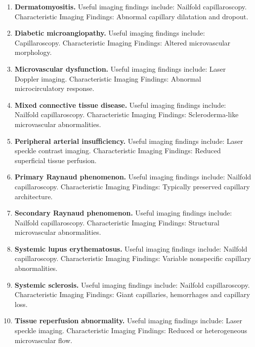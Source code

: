\begin{enumerate}[leftmargin=*,itemsep=0.45em,topsep=0.4em]
\item \textbf{Dermatomyositis.} Useful imaging findings include: Nailfold capillaroscopy. Characteristic Imaging Findings: Abnormal capillary dilatation and dropout.
\item \textbf{Diabetic microangiopathy.} Useful imaging findings include: Capillaroscopy. Characteristic Imaging Findings: Altered microvascular morphology.
\item \textbf{Microvascular dysfunction.} Useful imaging findings include: Laser Doppler imaging. Characteristic Imaging Findings: Abnormal microcirculatory response.
\item \textbf{Mixed connective tissue disease.} Useful imaging findings include: Nailfold capillaroscopy. Characteristic Imaging Findings: Scleroderma-like microvascular abnormalities.
\item \textbf{Peripheral arterial insufficiency.} Useful imaging findings include: Laser speckle contrast imaging. Characteristic Imaging Findings: Reduced superficial tissue perfusion.
\item \textbf{Primary Raynaud phenomenon.} Useful imaging findings include: Nailfold capillaroscopy. Characteristic Imaging Findings: Typically preserved capillary architecture.
\item \textbf{Secondary Raynaud phenomenon.} Useful imaging findings include: Nailfold capillaroscopy. Characteristic Imaging Findings: Structural microvascular abnormalities.
\item \textbf{Systemic lupus erythematosus.} Useful imaging findings include: Nailfold capillaroscopy. Characteristic Imaging Findings: Variable nonspecific capillary abnormalities.
\item \textbf{Systemic sclerosis.} Useful imaging findings include: Nailfold capillaroscopy. Characteristic Imaging Findings: Giant capillaries, hemorrhages and capillary loss.
\item \textbf{Tissue reperfusion abnormality.} Useful imaging findings include: Laser speckle imaging. Characteristic Imaging Findings: Reduced or heterogeneous microvascular flow.
\end{enumerate}

